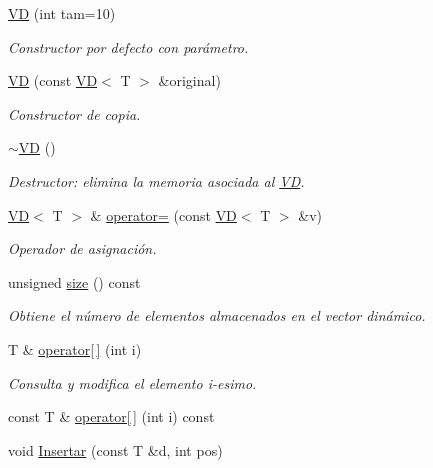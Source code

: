 \begin{DoxyCompactItemize}
\item 
\mbox{\hyperlink{class_v_d_a1ce73549d14f68caecaa593de3255c30}{VD}} (int tam=10)
\begin{DoxyCompactList}\small\item\em Constructor por defecto con parámetro. \end{DoxyCompactList}\item 
\mbox{\hyperlink{class_v_d_a4f22b92dd8ace25d50311ccd61508dfc}{VD}} (const \mbox{\hyperlink{class_v_d}{VD}}$<$ T $>$ \&original)
\begin{DoxyCompactList}\small\item\em Constructor de copia. \end{DoxyCompactList}\item 
\mbox{\hyperlink{class_v_d_a0533f99aa2fee31fde63edd6c4b8bb2d}{$\sim$\+VD}} ()
\begin{DoxyCompactList}\small\item\em Destructor\+: elimina la memoria asociada al \mbox{\hyperlink{class_v_d}{VD}}. \end{DoxyCompactList}\item 
\mbox{\hyperlink{class_v_d}{VD}}$<$ T $>$ \& \mbox{\hyperlink{class_v_d_a645b65a6343059cd921f6a2856c97249}{operator=}} (const \mbox{\hyperlink{class_v_d}{VD}}$<$ T $>$ \&v)
\begin{DoxyCompactList}\small\item\em Operador de asignación. \end{DoxyCompactList}\item 
unsigned \mbox{\hyperlink{class_v_d_a72e3d07e6d332f9e19512048d9e38c00}{size}} () const
\begin{DoxyCompactList}\small\item\em Obtiene el número de elementos almacenados en el vector dinámico. \end{DoxyCompactList}\item 
T \& \mbox{\hyperlink{class_v_d_a7d80240b5791d62b7e27657763afe712}{operator\mbox{[}$\,$\mbox{]}}} (int i)
\begin{DoxyCompactList}\small\item\em Consulta y modifica el elemento i-\/esimo. \end{DoxyCompactList}\item 
const T \& \mbox{\hyperlink{class_v_d_a16ae24a4b545a02baf6733ba5c066346}{operator\mbox{[}$\,$\mbox{]}}} (int i) const
\item 
void \mbox{\hyperlink{class_v_d_aded65b5f02cceb9780303afd5c88acb8}{Insertar}} (const T \&d, int pos)

\end{DoxyCompactItemize}
